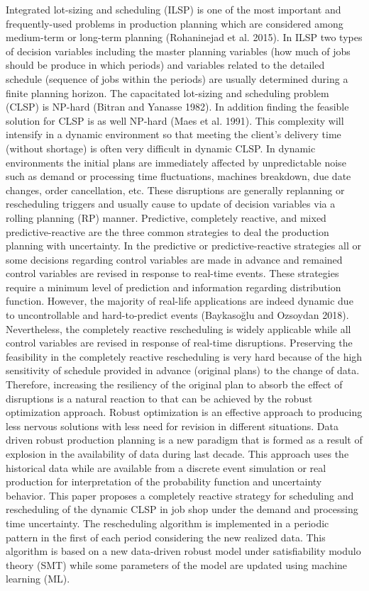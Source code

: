 \documentclass[letterpaper]{article} %
\begin{document}
Integrated lot-sizing and scheduling (ILSP) is one of the most important and frequently-used problems in production planning which are considered among medium-term or long-term planning (Rohaninejad et al. 2015). In ILSP two types of decision variables including the master planning variables (how much of jobs should be produce in which periods) and variables related to the detailed schedule (sequence of jobs within the periods) are usually determined during a finite planning horizon. The capacitated lot-sizing and scheduling problem (CLSP) is NP-hard (Bitran and Yanasse 1982). In addition finding the feasible solution for CLSP is as well NP-hard (Maes et al. 1991). This complexity will intensify in a dynamic environment so that meeting the client’s delivery time (without shortage) is often very difficult in dynamic CLSP. In dynamic environments the initial plans are immediately affected by unpredictable noise such as demand or processing time fluctuations, machines breakdown, due date changes, order cancellation, etc. These disruptions are generally replanning or rescheduling triggers and usually cause to update of decision variables via a rolling  planning (RP) manner. Predictive, completely reactive, and mixed predictive-reactive are the three common strategies to deal the production planning with uncertainty. In the predictive or predictive-reactive strategies all or some decisions regarding control variables are made in advance and remained control variables are revised in response to real-time events. These strategies require a minimum level of prediction and information regarding distribution function. However, the majority of real-life applications are indeed dynamic due to uncontrollable and hard-to-predict events (Baykasoğlu and Ozsoydan 2018). Nevertheless, the completely reactive rescheduling is widely applicable while all control variables are revised in response of real-time disruptions. Preserving the feasibility in the completely reactive rescheduling is very hard because of the high sensitivity of schedule provided in advance (original plans) to the change of data. Therefore, increasing the resiliency of the original plan to absorb the effect of disruptions is a natural reaction to that can be achieved by the robust optimization approach. Robust optimization is an effective approach to producing less nervous solutions with less need for revision in different situations.  Data driven robust production planning is a new paradigm that is formed as a result of explosion in the availability of data during last decade. This approach uses the  historical data while are available from a discrete event simulation or real production for interpretation of the probability function and uncertainty behavior.
This paper proposes a completely reactive strategy for scheduling and rescheduling of the dynamic CLSP in job shop under the demand and processing time uncertainty. The rescheduling algorithm is implemented in a periodic pattern in the first of each period considering the new realized data. This algorithm is based on a new data-driven robust model under satisfiability modulo theory (SMT) while some parameters of the model are updated using  machine learning (ML). 
\end{document}
